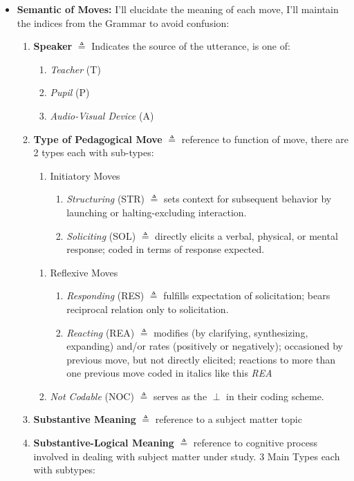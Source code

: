 \documentclass[10pt, letterpaper]{article}
\begin{document}
\begin{itemize}
\item \textbf{Semantic of Moves:}
\label{sec:org479aaeb}
I'll elucidate the meaning of each move, I'll maintain the indices from the Grammar to avoid confusion:
\begin{enumerate}
\item \textbf{Speaker} \(\triangleq\) Indicates the source of the utterance, is one of:
\begin{enumerate}
\item \emph{Teacher} (T)
\item \emph{Pupil} (P)
\item \emph{Audio-Visual Device} (A)
\end{enumerate}
\item \textbf{Type of Pedagogical Move} \(\triangleq\) reference to function of move, there are 2 types each with sub-types:
\begin{enumerate}
\item Initiatory Moves
\begin{enumerate}
\item \emph{Structuring} (STR) \(\triangleq\) sets context for subsequent behavior by launching or halting-excluding interaction.
\item \emph{Soliciting} (SOL) \(\triangleq\) directly elicits a verbal, physical, or mental response; coded in terms of response expected.
\end{enumerate}
\end{enumerate}
\begin{enumerate}
\item Reflexive Moves
\begin{enumerate}
\item \emph{Responding} (RES) \(\triangleq\) fulfills expectation of solicitation; bears reciprocal relation only to solicitation.
\item \emph{Reacting} (REA) \(\triangleq\) modifies (by clarifying, synthesizing, expanding) and/or rates (positively or negatively); occasioned by previous move, but not directly elicited; reactions to more than one previous move coded in italics like this \emph{REA}
\end{enumerate}
\item \emph{Not Codable} (NOC) \(\triangleq\) serves as the \(\perp\) in their coding scheme.
\end{enumerate}
\item \textbf{Substantive Meaning} \(\triangleq\) reference to a subject matter topic
\item \textbf{Substantive-Logical Meaning} \(\triangleq\) reference to cognitive process involved in dealing with subject matter under study. 3 Main Types each with subtypes:

\end{enumerate}
\end{itemize}
\end{document}
